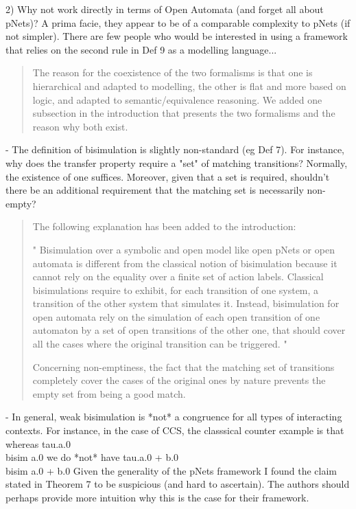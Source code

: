 \documentclass{article}
\begin{document}
2) Why not work directly in terms of Open Automata (and forget all about pNets)?  A prima facie, they appear to be of a comparable complexity to pNets (if not simpler).  There are few people who would be interested in using a framework that relies on the second rule in Def 9 as a modelling language...  
\begin{quote}
The reason for the coexistence of the two formalisms is that one is hierarchical and adapted to modelling, the other is flat and more based on logic, and adapted to semantic/equivalence reasoning.
We added one subsection in the introduction that presents the two formalisms and the reason why both exist.
\end{quote}

- The definition of bisimulation is slightly non-standard (eg Def 7).  For instance, why does the transfer property require a "set" of matching transitions?  Normally, the existence of one suffices.  Moreover, given that a set is required, shouldn't there be an additional requirement that the matching set is necessarily non-empty? 

\begin{quote}
The following explanation has been added to the introduction:

" Bisimulation over a symbolic and open model like open pNets or open automata is  different from the classical notion of bisimulation because it cannot rely on the equality over a finite set of action labels. Classical bisimulations require to exhibit, for each transition of one system, a transition of the other system that simulates it. Instead, bisimulation for open automata  rely on the simulation of each open transition of one automaton by a set of open transitions of the other one, that should cover all the 
cases where the original transition can be triggered.
"

Concerning non-emptiness, the fact that the matching set of transitions completely cover the cases of the original ones by nature prevents the empty set from being a good match. 
\end{quote}

- In general, weak bisimulation is *not* a congruence for all types of interacting contexts.  For instance, in the case of CCS, the classsical counter example is that whereas 
tau.a.0  \\bisim  a.0
we do *not* have
tau.a.0 + b.0 \\bisim  a.0 + b.0 
Given the generality of the pNets framework I found the claim stated in Theorem 7 to be suspicious (and hard to ascertain).  The authors should perhaps provide more intuition why this is the case for their framework.
\end{document}
